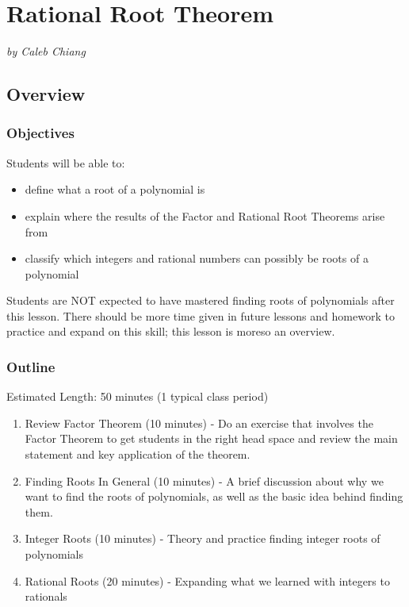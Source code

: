 \chapter{Rational Root Theorem}

\emph{by Caleb Chiang}

\section{Overview}

\subsection{Objectives}

Students will be able to:

\begin{itemize}
    \item define what a root of a polynomial is
    \item explain where the results of the Factor and Rational Root Theorems arise from
    \item classify which integers and rational numbers can possibly be roots of a polynomial 
\end{itemize}

Students are NOT expected to have mastered finding roots of polynomials after this lesson. There should be more time given in future lessons and homework to practice and expand on this skill; this lesson is moreso an overview.

\subsection{Outline}

Estimated Length: 50 minutes (1 typical class period)

\begin{enumerate}
    \item Review Factor Theorem (10 minutes) - Do an exercise that involves the Factor Theorem to get students in the right head space and review the main statement and key application of the theorem.
    \item Finding Roots In General (10 minutes) - A brief discussion about why we want to find the roots of polynomials, as well as the basic idea behind finding them.
    \item Integer Roots (10 minutes) - Theory and practice finding integer roots of polynomials
    \item Rational Roots (20 minutes) - Expanding what we learned with integers to rationals
\end{enumerate}

